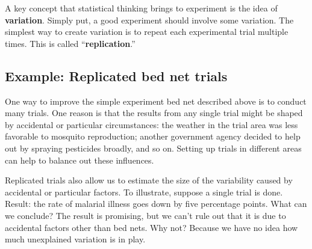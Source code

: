 \documentclass[
  letterpaper,
  DIV=11,
  numbers=noendperiod,
  oneside]{scrartcl}
\begin{document}
A key concept that statistical thinking brings to experiment is the idea
of \textbf{variation}. Simply put, a good experiment should involve some
variation. The simplest way to create variation is to repeat each
experimental trial multiple times. This is called
``\textbf{replication}.''

\subsection{Example: Replicated bed net
trials}\label{example-replicated-bed-net-trials}

One way to improve the simple experiment bed net described above is to
conduct many trials. One reason is that the results from any single
trial might be shaped by accidental or particular circumstances: the
weather in the trial area was less favorable to mosquito reproduction;
another government agency decided to help out by spraying pesticides
broadly, and so on. Setting up trials in different areas can help to
balance out these influences.

Replicated trials also allow us to estimate the size of the variability
caused by accidental or particular factors. To illustrate, suppose a
single trial is done. Result: the rate of malarial illness goes down by
five percentage points. What can we conclude? The result is promising,
but we can't rule out that it is due to accidental factors other than
bed nets. Why not? Because we have no idea how much unexplained
variation is in play.

\end{document}
